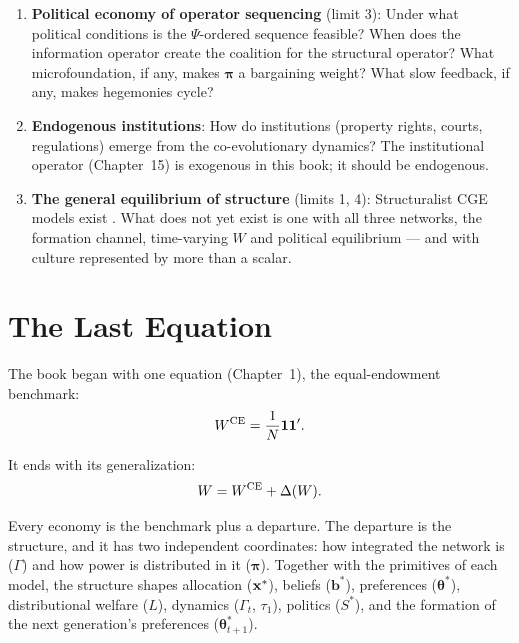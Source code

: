 \documentclass[../structural_economics_book.tex]{subfiles}
\begin{document}
\begin{enumerate}
\item \textbf{Political economy of operator sequencing} (limit 3): Under what political conditions is the $\Psi$-ordered sequence feasible? When does the information operator create the coalition for the structural operator? What microfoundation, if any, makes $\boldsymbol{\pi}$ a bargaining weight? What slow feedback, if any, makes hegemonies cycle?

\item \textbf{Endogenous institutions}: How do institutions (property rights, courts, regulations) emerge from the co-evolutionary dynamics? The institutional operator (Chapter~15) is exogenous in this book; it should be endogenous.

\item \textbf{The general equilibrium of structure} (limits 1, 4): Structuralist CGE models exist \citep[\textit{Socially Relevant Policy Analysis: Structuralist Computable General Equilibrium Models for the Developing World}]{taylor1990socially}. What does not yet exist is one with all three networks, the formation channel, time-varying $W$ and political equilibrium --- and with culture represented by more than a scalar.
\end{enumerate}


\section{The Last Equation}
\label{ch28:sec:last}

The book began with one equation (Chapter~1), the equal-endowment benchmark:
\begin{equation}
W^{\text{CE}} = \frac{1}{N}\mathbf{1}\mathbf{1}'.
\end{equation}

It ends with its generalization:
\begin{equation}\label{ch28:eq:last}
W = W^{\text{CE}} + \Delta(W).
\end{equation}

Every economy is the benchmark plus a departure. The departure is the structure, and it has two independent coordinates: how integrated the network is ($\Gamma$) and how power is distributed in it ($\boldsymbol{\pi}$). Together with the primitives of each model, the structure shapes allocation ($\mathbf{x}^*$), beliefs ($\mathbf{b}^*$), preferences ($\boldsymbol{\theta}^*$), distributional welfare ($L$), dynamics ($\Gamma_t$, $\tau_1$), politics ($S^*$), and the formation of the next generation's preferences ($\boldsymbol{\theta}^*_{t+1}$).
\end{document}
